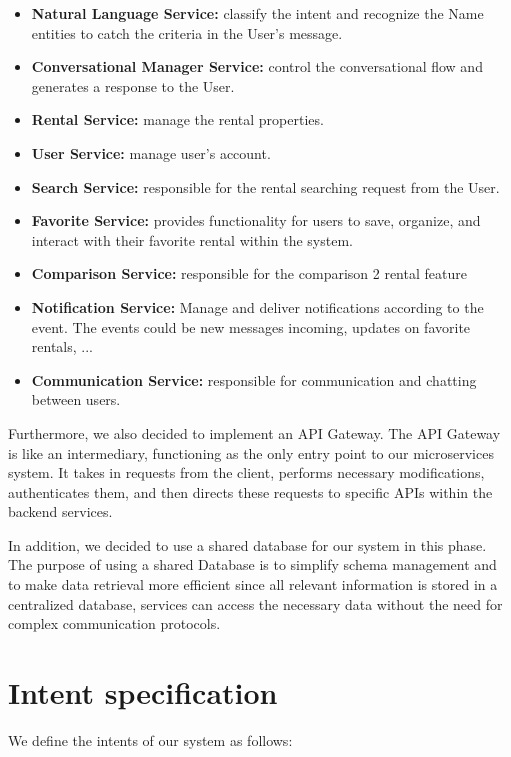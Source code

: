 \begin{itemize}
    \item \textbf{Natural Language Service:} classify the intent and recognize the Name entities to catch the criteria in the User's message.
    \item \textbf{Conversational Manager Service:} control the conversational flow and generates a response to the User.
    \item \textbf{Rental Service:} manage the rental properties.
    \item \textbf{User Service:} manage user's account.
    \item \textbf{Search Service:} responsible for the rental searching request from the User.
    \item \textbf{Favorite Service:} provides functionality for users to save, organize, and interact with their favorite rental within the system.
    \item \textbf{Comparison Service:} responsible for the comparison 2 rental feature 
    \item \textbf{Notification Service:} Manage and deliver notifications according to the event. The events could be new messages incoming, updates on favorite rentals, ...
    \item \textbf{Communication Service:} responsible for communication and chatting between users.
\end{itemize}

Furthermore, we also decided to implement an API Gateway. The API Gateway is like an intermediary, functioning as the only entry point to our microservices system. It takes in requests from the client, performs necessary modifications, authenticates them, and then directs these requests to specific APIs within the backend services.

In addition, we decided to use a shared database for our system in this phase. The purpose of using a shared Database is to simplify schema management and to make data retrieval more efficient since all relevant information is stored in a centralized database, services can access the necessary data without the need for complex communication protocols.

\clearpage

\section{Intent specification}
We define the intents of our system as follows:

